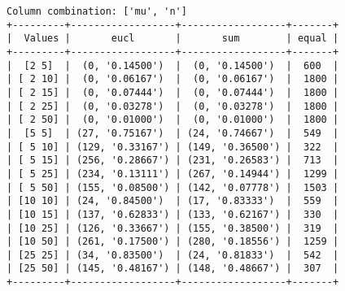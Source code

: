 \documentclass{article}
\begin{document}
\begin{verbatim}
Column combination: ['mu', 'n']
+---------+------------------+------------------+-------+
|  Values |       eucl       |       sum        | equal |
+---------+------------------+------------------+-------+
|  [2 5]  |  (0, '0.14500')  |  (0, '0.14500')  |  600  |
| [ 2 10] |  (0, '0.06167')  |  (0, '0.06167')  |  1800 |
| [ 2 15] |  (0, '0.07444')  |  (0, '0.07444')  |  1800 |
| [ 2 25] |  (0, '0.03278')  |  (0, '0.03278')  |  1800 |
| [ 2 50] |  (0, '0.01000')  |  (0, '0.01000')  |  1800 |
|  [5 5]  | (27, '0.75167')  | (24, '0.74667')  |  549  |
| [ 5 10] | (129, '0.33167') | (149, '0.36500') |  322  |
| [ 5 15] | (256, '0.28667') | (231, '0.26583') |  713  |
| [ 5 25] | (234, '0.13111') | (267, '0.14944') |  1299 |
| [ 5 50] | (155, '0.08500') | (142, '0.07778') |  1503 |
| [10 10] | (24, '0.84500')  | (17, '0.83333')  |  559  |
| [10 15] | (137, '0.62833') | (133, '0.62167') |  330  |
| [10 25] | (126, '0.33667') | (155, '0.38500') |  319  |
| [10 50] | (261, '0.17500') | (280, '0.18556') |  1259 |
| [25 25] | (34, '0.83500')  | (24, '0.81833')  |  542  |
| [25 50] | (145, '0.48167') | (148, '0.48667') |  307  |
+---------+------------------+------------------+-------+
\end{verbatim}
\end{document}
